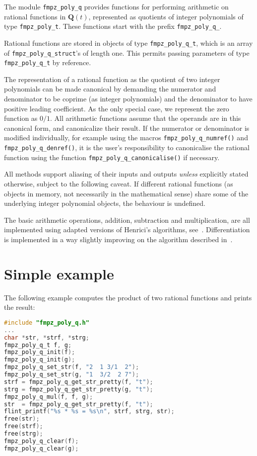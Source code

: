 \documentclass[a4paper,10pt]{book}
\newcommand{\code}{\lstinline}
\begin{document}
{{The module \code{fmpz_poly_q} provides functions for performing
arithmetic on rational functions in $\mathbf{Q}(t)$, represented as
quotients of integer polynomials of type \code{fmpz_poly_t}.  These
functions start with the prefix \code{fmpz_poly_q_}.

Rational functions are stored in objects of type \code{fmpz_poly_q_t},
which is an array of \code{fmpz_poly_q_struct}'s of length one.  This
permits passing parameters of type \code{fmpz_poly_q_t} by reference.

The representation of a rational function as the quotient of two integer
polynomials can be made canonical by demanding the numerator and
denominator to be coprime (as integer polynomials) and the denominator to
have positive leading coefficient.  As the only special case, we represent
the zero function as $0/1$.  All arithmetic functions assume that the
operands are in this canonical form, and canonicalize their result.  If the
numerator or denominator is modified individually, for example using the
macros \code{fmpz_poly_q_numref()} and \code{fmpz_poly_q_denref()},
it is the user's responsibility to canonicalise the rational function
using the function \code{fmpz_poly_q_canonicalise()} if necessary.

All methods support aliasing of their inputs and outputs \emph{unless}
explicitly stated otherwise, subject to the following caveat.  If
different rational functions (as objects in memory, not necessarily in the
mathematical sense) share some of the underlying integer polynomial
objects, the behaviour is undefined.

The basic arithmetic operations, addition, subtraction and multiplication,
are all implemented using adapted versions of Henrici's algorithms,
see~\citep{Hen1956}.  Differentiation is implemented in a way slightly
improving on the algorithm described in~\citep{Hor1972}.

\section{Simple example}


The following example computes the product of two rational functions and
prints the result:
\begin{lstlisting}[language=c]
#include "fmpz_poly_q.h"
...
char *str, *strf, *strg;
fmpz_poly_q_t f, g;
fmpz_poly_q_init(f);
fmpz_poly_q_init(g);
fmpz_poly_q_set_str(f, "2  1 3/1  2");
fmpz_poly_q_set_str(g, "1  3/2  2 7");
strf = fmpz_poly_q_get_str_pretty(f, "t");
strg = fmpz_poly_q_get_str_pretty(g, "t");
fmpz_poly_q_mul(f, f, g);
str  = fmpz_poly_q_get_str_pretty(f, "t");
flint_printf("%s * %s = %s\n", strf, strg, str);
free(str);
free(strf);
free(strg);
fmpz_poly_q_clear(f);
fmpz_poly_q_clear(g);
\end{lstlisting}

}}
\end{document}
